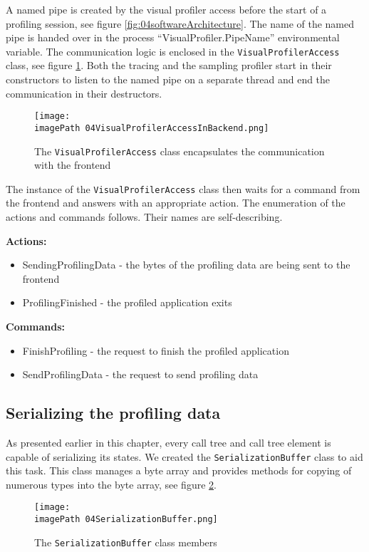 A named pipe is created by the visual profiler access before the start of a profiling session, see figure \ref{fig:04softwareArchitecture}. The name of the named pipe is handed over in the process ``VisualProfiler.PipeName'' environmental variable. The communication logic is enclosed in the \texttt{VisualProfilerAccess} class, see figure \ref{fig:04VisualProfilerAccessInBackend}. Both the tracing and the sampling profiler start in their constructors to listen to the named pipe on a separate thread and end the communication in their destructors.

\begin{figure}
	\centering
		\texttt{[image: \\imagePath 04VisualProfilerAccessInBackend.png]}
		\caption{The \texttt{VisualProfilerAccess} class encapsulates the communication with the frontend}
	\label{fig:04VisualProfilerAccessInBackend}
\end{figure}

The instance of the \texttt{VisualProfilerAccess} class then waits for a command from the frontend and answers with an appropriate action. The enumeration of the actions and commands follows. Their names are self-describing.

\textbf{Actions:}
\begin{itemize}	
\item	SendingProfilingData - the bytes of the profiling data are being sent to the frontend
\item	ProfilingFinished - the profiled application exits
\end{itemize}

\textbf{Commands:}
\begin{itemize}	
\item	FinishProfiling - the request to finish the profiled application
\item	SendProfilingData - the request to send profiling data
\end{itemize}

\subsection{Serializing the profiling data}
As presented earlier in this chapter, every call tree and call tree element is capable of serializing its states. We created the \texttt{SerializationBuffer} class to aid this task. This class manages a byte array and provides methods for copying of numerous types into the byte array, see figure \ref{fig:04SerializationBuffer}.

\begin{figure}
	\centering
		\texttt{[image: \\imagePath 04SerializationBuffer.png]}
		\caption{The \texttt{SerializationBuffer} class members}
	\label{fig:04SerializationBuffer}
\end{figure}

